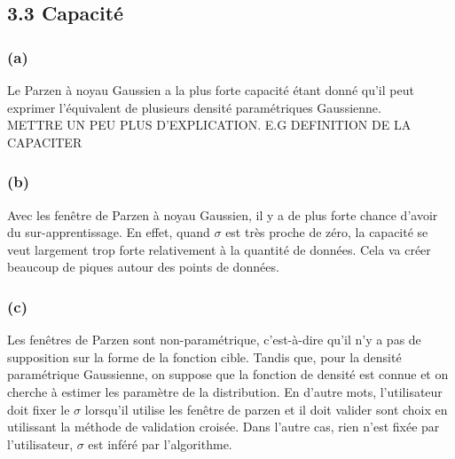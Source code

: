 \documentclass[12pt]{article}
\begin{document}
\subsection{3.3 Capacité}
\subsubsection{(a)}
Le Parzen à noyau Gaussien a la plus forte capacité étant donné qu'il peut exprimer l'équivalent de plusieurs densité paramétriques Gaussienne. 
\\
METTRE UN PEU PLUS D'EXPLICATION. E.G DEFINITION DE LA CAPACITER
\subsubsection{(b)}
Avec les fenêtre de Parzen à noyau Gaussien, il y a de plus forte chance d'avoir du sur-apprentissage. En effet, quand $\sigma$ est très proche de zéro, la capacité se veut largement trop forte relativement à la quantité de données. Cela va créer beaucoup de piques autour des points de données. 

\subsubsection{(c)}
Les fenêtres de Parzen sont non-paramétrique, c'est-à-dire qu'il n'y a pas de supposition sur la forme de la fonction cible. Tandis que, pour la densité paramétrique Gaussienne, on suppose que la fonction de densité est connue et on cherche à estimer les paramètre de la distribution. En d'autre mots, l'utilisateur doit fixer le $\sigma$ lorsqu'il utilise les fenêtre de parzen et il doit valider sont choix en utilissant la méthode de validation croisée. Dans l'autre cas, rien n'est fixée par l'utilisateur,  $\sigma$ est inféré par l'algorithme.
\end{document}
